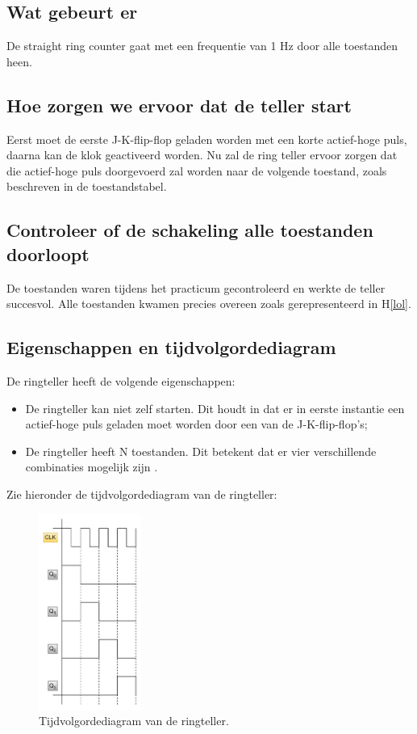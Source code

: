 \documentclass[12pt]{article}
\begin{document}
\subsection{Wat gebeurt er}
De straight ring counter gaat met een frequentie van 1 Hz door alle toestanden heen. 
\subsection{Hoe zorgen we ervoor dat de teller start}
Eerst moet de eerste J-K-flip-flop geladen worden met een korte actief-hoge puls, daarna kan de klok geactiveerd worden. Nu zal de ring teller ervoor zorgen dat die actief-hoge puls doorgevoerd zal worden naar de volgende toestand, zoals beschreven in de toestandstabel.
\subsection{Controleer of de schakeling alle toestanden doorloopt}
De toestanden waren tijdens het practicum gecontroleerd en werkte de teller succesvol. 
Alle toestanden kwamen precies overeen zoals gerepresenteerd in H\ref{lol}.
\pagebreak
\subsection{Eigenschappen en tijdvolgordediagram}
De ringteller heeft de volgende eigenschappen:
\begin{itemize}
    \item De ringteller kan niet zelf starten. Dit houdt in dat er in eerste instantie een actief-hoge puls geladen moet worden door een van de J-K-flip-flop's;
    \item De ringteller heeft N toestanden. Dit betekent dat er vier verschillende combinaties mogelijk zijn \cite{schuifregister}.
\end{itemize}
Zie hieronder de tijdvolgordediagram van de ringteller:
\begin{figure}[h]
    \centering
    \includegraphics[width=0.3\textwidth]{tijd1.png}
    \caption{Tijdvolgordediagram van de ringteller.}
    \label{fig:johssn113}
\end{figure} 
\pagebreak
\end{document}
